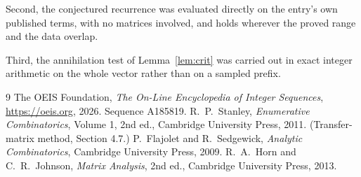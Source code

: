 \documentclass[11pt,a4paper]{article}
\theoremstyle{plain}
\theoremstyle{definition}
\begin{document}
Second, the conjectured recurrence was evaluated directly on the entry's own published terms,
with no matrices involved, and holds wherever the proved range and the data overlap.

Third, the annihilation test of Lemma~\ref{lem:crit} was carried out in exact integer
arithmetic on the whole vector rather than on a sampled prefix.

\begin{thebibliography}{9}
 The OEIS Foundation, \emph{The On-Line Encyclopedia of Integer
Sequences}, \url{https://oeis.org}, 2026. Sequence A185819.
 R.~P.~Stanley, \emph{Enumerative Combinatorics}, Volume 1, 2nd ed.,
Cambridge University Press, 2011. (Transfer-matrix method, Section 4.7.)
 P.~Flajolet and R.~Sedgewick, \emph{Analytic Combinatorics}, Cambridge
University Press, 2009.
 R.~A.~Horn and C.~R.~Johnson, \emph{Matrix Analysis}, 2nd ed., Cambridge
University Press, 2013.
\end{thebibliography}
\end{document}
